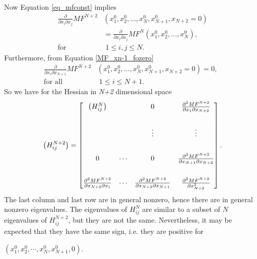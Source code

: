 Now Equation \ref{eq_mfconst} implies
\begin{equation}
\begin{split}
\frac{\partial}{\partial{x_i}\partial{x_j}}MF^{N+2}&(x^{0}_1, x^{0}_{2},...,x^{0}_{N},x^{0}_{N+1},x_{N+2}=0) \\
&= \frac{\partial}{\partial{x_i}\partial{x_j}}MF^{N}(x^{0}_1, x^{0}_{2},...,x^{0}_{N}), \\
\text{for} \;\;&\; 1\leq i,j \leq N.
\end{split}
\end{equation}Furthermore, from Equation \ref{MF_xn-1_fozero}
\begin{equation}
\begin{split}
\frac{\partial}{\partial{x_i}\partial{x_{N+1}}}MF^{N+2}&(x^{0}_1, x^{0}_{2},...,x^{0}_{N},x^{0}_{N+1},x_{N+2}=0) = 0, \;\; \\
\text{for all} & \;1\leq i \leq N+1.
\end{split}
\end{equation}
So we have for the Hessian in \textit{N+2} dimensional space
\begin{equation}\label{eq: the hessian}
\left( H^{N+2}_{ij} \right) = 
\begin{bmatrix}
\Large{\left( H^N_{ij} \right)}       &                 &   0                  & \frac{\partial{^2MF^{N+2}}}{\partial{x_1}\partial{x_{N+2}}} \\[2em]
                                                    &                 & \vdots         & \vdots \\[2em]
 0                                                 & \cdots    & 0                  & \frac{\partial{^2MF^{N+2}}}{\partial{x_{N+1}\partial{x_{N+2}}}}  \\[2em]
 \frac{\partial{^2MF^{N+2}}}{\partial{x_{N+2}}\partial{x_1}}   &\cdots  & \frac{\partial{^2MF^{N+2}}}{\partial{x_{N+2}}\partial{x_{N+1}}} & \frac{\partial{^2MF^{N+2}}}{\partial{x^2_{N+2}}}
\end{bmatrix}.
\end{equation}The last column and last row are in general nonzero, hence there are in general nonzero eigenvalues.
The eigenvalues of $H^{N}_{ij}$ are similar to a subset of $N$ eigenvalues of $H^{N+2}_{ij}$, but they are not the same. Nevertheless, it may be expected that they have the same sign, i.e. they are positive for

\vspace{0.1em}
\centerline {$(x^0_1, x^0_{2},\cdots,x^0_{N}, x^0_{N+1},0)$.}
\vspace{0.5em}

